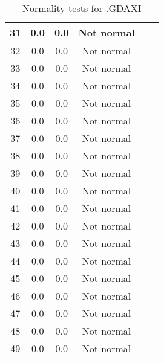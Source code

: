 \begin{table}[h]
\begin{tabular}{|c|c|c|c|c|c|}
		31 & 0.0 & 0.0 & Not normal\\\hline
		32 & 0.0 & 0.0 & Not normal\\\hline
		33 & 0.0 & 0.0 & Not normal\\\hline
		34 & 0.0 & 0.0 & Not normal\\\hline
		35 & 0.0 & 0.0 & Not normal\\\hline
		36 & 0.0 & 0.0 & Not normal\\\hline
		37 & 0.0 & 0.0 & Not normal\\\hline
		38 & 0.0 & 0.0 & Not normal\\\hline
		39 & 0.0 & 0.0 & Not normal\\\hline
		40 & 0.0 & 0.0 & Not normal\\\hline
		41 & 0.0 & 0.0 & Not normal\\\hline
		42 & 0.0 & 0.0 & Not normal\\\hline
		43 & 0.0 & 0.0 & Not normal\\\hline
		44 & 0.0 & 0.0 & Not normal\\\hline
		45 & 0.0 & 0.0 & Not normal\\\hline
		46 & 0.0 & 0.0 & Not normal\\\hline
		47 & 0.0 & 0.0 & Not normal\\\hline
		48 & 0.0 & 0.0 & Not normal\\\hline
		49 & 0.0 & 0.0 & Not normal\\\hline
	\end{tabular}
	\caption{Normality tests for .GDAXI}
	\label{tab:normality_tests_.GDAXI_}
\end{table}
